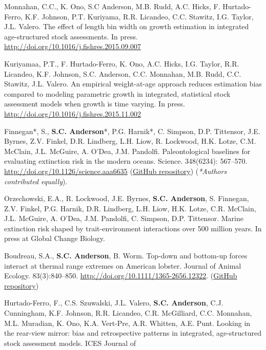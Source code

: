 \begin{description}
\itemsep3pt\parskip0pt
\item[2015]
Monnahan, C.C., K. Ono, S.C Anderson, M.B. Rudd, A.C. Hicks, F.
Hurtado-Ferro, K.F. Johnson, P.T. Kuriyama, R.R. Licandeo, C.C. Stawitz,
I.G. Taylor, J.L. Valero. The effect of length bin width on growth
estimation in integrated age-structured stock assessments. In press.
\url{http://doi.org/10.1016/j.fishres.2015.09.007}
\item[2015]
Kuriyamaa, P.T., F. Hurtado-Ferro, K. Ono, A.C. Hicks, I.G. Taylor, R.R.
Licandeo, K.F. Johnson, S.C. Anderson, C.C. Monnahan, M.B. Rudd, C.C.
Stawitz, J.L. Valero. An empirical weight-at-age approach reduces
estimation bias compared to modeling parametric growth in integrated,
statistical stock assessment models when growth is time varying. In
press. \url{http://doi.org/10.1016/j.fishres.2015.11.002}
\item[2015]
Finnegan*, S., \textbf{S.C. Anderson}*, P.G. Harnik*, C. Simpson, D.P.
Tittensor, J.E. Byrnes, Z.V. Finkel, D.R. Lindberg, L.H. Liow, R.
Lockwood, H.K. Lotze, C.M. McClain, J.L. McGuire, A. O'Dea, J.M.
Pandolfi. Paleontological baselines for evaluating extinction risk in
the modern oceans. Science. 348(6234): 567--570.
\url{http://doi.org/10.1126/science.aaa6635}
(\href{https://github.com/seananderson/paleobaselines}{GitHub
repository}) (\emph{*Authors contributed equally}).
\item[2015]
Orzechowski, E.A., R. Lockwood, J.E. Byrnes, \textbf{S.C. Anderson}, S.
Finnegan, Z.V. Finkel, P.G. Harnik, D.R. Lindberg, L.H. Liow, H.K.
Lotze, C.R. McClain, J.L. McGuire, A. O'Dea, J.M. Pandolfi, C. Simpson,
D.P. Tittensor. Marine extinction risk shaped by trait-environment
interactions over 500 million years. In press at Global Change Biology.
\item[2015]
Boudreau, S.A., \textbf{S.C. Anderson}, B. Worm. Top-down and bottom-up
forces interact at thermal range extremes on American lobster. Journal
of Animal Ecology. 83(3):840--850.
\url{http://doi.org/10.1111/1365-2656.12322}.
(\href{https://github.com/seananderson/lobsters-predators}{GitHub
repository})
\item[2015]
Hurtado-Ferro, F., C.S. Szuwalski, J.L. Valero, \textbf{S.C. Anderson},
C.J. Cunningham, K.F. Johnson, R.R. Licandeo, C.R. McGilliard, C.C.
Monnahan, M.L. Muradian, K. Ono, K.A. Vert-Pre, A.R. Whitten, A.E. Punt.
Looking in the rear-view mirror: bias and retrospective patterns in
integrated, age-structured stock assessment models. ICES Journal of

\end{description}
